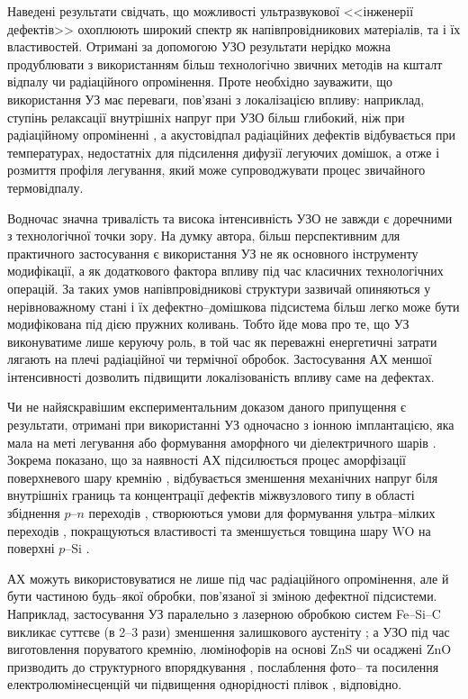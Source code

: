 Наведені результати свідчать, що можливості ультразвукової <<інженерії дефектів>> охоплюють широкий спектр як напівпровідникових матеріалів, та і їх властивостей.
Отримані за допомогою УЗО результати нерідко можна продублювати з використанням більш технологічно звичних методів на кшталт відпалу чи радіаційного опромінення.
Проте необхідно зауважити, що використання УЗ має переваги, пов'язані з локалізацією впливу:
наприклад, ступінь релаксації внутрішніх напруг при УЗО більш глибокий, ніж при радіаційному опроміненні \cite{UST:GeGaAs1990},
а акустовідпал радіаційних дефектів \cite{PodolHivr,UST:OstrovCsI,YOlikh2007TPLr} відбувається при температурах, недостатніх для підсилення дифузії легуючих домішок, а отже і розмиття профіля легування, який може супроводжувати процес звичайного термовідпалу.

Водночас значна тривалість та висока інтенсивність УЗО не завжди є доречними з технологічної точки зору.
На думку автора, більш перспективним для практичного застосування є використання УЗ не як основного інструменту модифікації, а як додаткового фактора впливу під час класичних технологічних операцій.
За таких умов напівпровідникові структури зазвичай опиняються у нерівноважному стані і їх дефектно--домішкова підсистема більш легко може бути модифікована під дією пружних коливань.
Тобто йде мова про те, що УЗ виконуватиме лише керуючу роль, в той час як переважні енергетичні затрати
лягають на плечі радіаційної чи термічної обробок.
Застосування  АХ  меншої інтенсивності дозволить підвищити локалізованість впливу саме на дефектах.

Чи не найяскравішим експериментальним доказом даного припущення є результати, отримані при
використанні УЗ одночасно з іонною імплантацією, яка мала на меті легування або формування аморфного чи діелектричного шарів \cite{US:ImplantUFJ2015,US:ImplantUFJ2001,US:ImplantUFJ2008,ROMANYUK2005,Roman2006,RomanyukSST,
YOlikh2005,ROMANJUK2005MatSci,USImplant:JVacSci}.
Зокрема показано, що за наявності АХ
підсилюється процес аморфізації поверхневого шару кремнію \cite{RomanyukSST,US:ImplantUFJ2001},
відбувається зменшення механічних напруг біля внутрішніх границь \cite{US:ImplantUFJ2008,ROMANJUK2005MatSci}
та концентрації дефектів міжвузлового типу в області збіднення $p$--$n$ переходів \cite{YOlikh2005},
створюються умови для формування ультра--мілких переходів \cite{USImplant:JVacSci},
покращуються властивості та зменшується товщина шару WO на поверхні $p$--Si \cite{ROMANYUK2005,Roman2006}.

АХ можуть використовуватися не лише під час радіаційного опромінення, але й бути частиною будь--якої обробки, пов'язаної зі зміною дефектної підсистеми.
Наприклад, застосування УЗ паралельно з лазерною обробкою систем Fe--Si--C викликає суттєве (в 2--3 рази) зменшення залишкового аустеніту \cite{US:FeSiC};
а УЗО під час виготовлення поруватого кремнію, люмінофорів на основі ZnS чи осаджені ZnO призводить до структурного впорядкування \cite{Kalem2000}, послаблення фото-- та посилення електролюмінесценцій \cite{Wang:JLum} чи підвищення однорідності плівок \cite{US:ZnOfilm}, відповідно.



